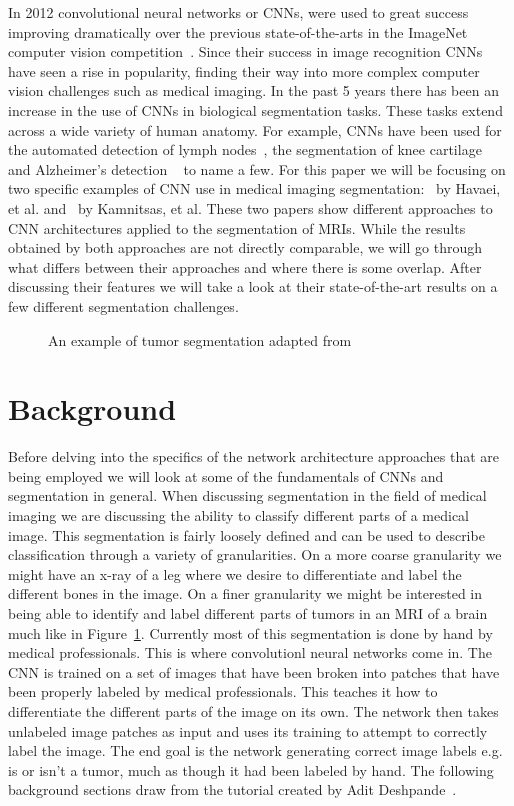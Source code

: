 \documentclass{sig-alternate}
\begin{document}
In 2012 convolutional neural networks or CNNs, were used to great success improving dramatically over the previous state-of-the-arts in the ImageNet computer vision competition~\cite{NIPS:2012}. Since their success in image recognition CNNs have seen a rise in popularity, finding their way into more complex computer vision challenges such as medical imaging. In the past 5 years there has been an increase in the use of CNNs in biological segmentation tasks. These tasks extend across a wide variety of human anatomy. For example, CNNs have been used for the automated detection of lymph nodes~\cite{Roth:2014}, the segmentation of knee cartilage~\cite{Prasoon:2013} and Alzheimer's detection ~\cite{Payan:2015} to name a few. For this paper we will be focusing on two specific examples of CNN use in medical imaging segmentation:~\cite{Havaei:2017} by Havaei, et al. and~\cite{Kamnitsas:2017} by Kamnitsas, et al. These two papers show different approaches to CNN architectures applied to the segmentation of MRIs. While the results obtained by both approaches are not directly comparable, we will go through what differs between their approaches and where there is some overlap. After discussing their features we will take a look at their state-of-the-art results on a few different segmentation challenges.

\begin{figure}
\centering
{}
\caption{An example of tumor segmentation adapted from~\cite{Kamnitsas:2017}}
\label{fig:brainMRI}
\end{figure}

\section{Background}
\label{sec:background}

Before delving into the specifics of the network architecture approaches that are being employed we will look at some of the fundamentals of CNNs and segmentation in general. When discussing segmentation in the field of medical imaging we are discussing the ability to classify different parts of a medical image. This segmentation is fairly loosely defined and can be used to describe classification through a variety of granularities. On a more coarse granularity we might have an x-ray of a leg where we desire to differentiate and label the different bones in the image. On a finer granularity we might be interested in being able to identify and label different parts of tumors in an MRI of a brain much like in Figure~\ref{fig:brainMRI}. Currently most of this segmentation is done by hand by medical professionals. This is where convolutionl neural networks come in. The CNN is trained on a set of images that have been broken into patches that have been properly labeled by medical professionals. This teaches it how to differentiate the different parts of the image on its own. The network then takes unlabeled image patches as input and uses its training to attempt to correctly label the image. The end goal is the network generating correct image labels e.g. is or isn't a tumor, much as though it had been labeled by hand. The following background sections draw from the tutorial created by Adit Deshpande~\cite{deshpande_2016}.
\end{document}
